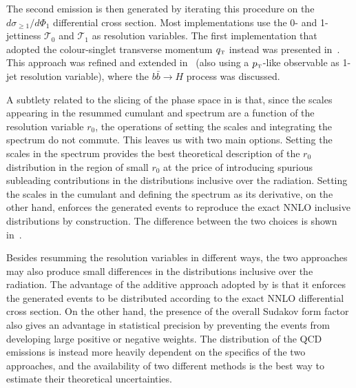\documentclass[11pt,a4paper]{article}
\begin{document}
The second emission is then generated by iterating this procedure on
the $d\sigma_{\geq 1} / d\Phi_1$ differential cross section. Most
\GENEVA{} implementations use the 0- and 1-jettiness $\mathcal{T}_0$
and $\mathcal{T}_1$ as resolution variables. The first implementation
that adopted the colour-singlet transverse momentum
$q_{\scriptscriptstyle\rm T}$ instead was presented
in~\cite{alioli:2021qbf}. This approach was refined and extended
in~\cite{Gavardi:2025zpf} (also using a $p_{\scriptscriptstyle\rm
  T}$-like observable as 1-jet resolution variable), where the $b
\bar{b} \to H$ process was discussed.

A subtlety related to the slicing of the phase space in \GENEVA{} is
that, since the scales appearing in the resummed cumulant and spectrum
are a function of the resolution variable $r_0$, the operations of
setting the scales and integrating the spectrum do not commute. This
leaves us with two main options. Setting the scales in the spectrum
provides the best theoretical description of the $r_0$ distribution in
the region of small $r_0$ at the price of introducing spurious
subleading contributions in the distributions inclusive over the
radiation. Setting the scales in the cumulant and defining the
spectrum as its derivative, on the other hand, enforces the generated
events to reproduce the exact NNLO inclusive distributions by
construction. The difference between the two choices is shown
in~.

Besides resumming the resolution variables in different ways, the two
approaches may also produce small differences in the distributions
inclusive over the radiation. The advantage of the additive approach
adopted by \GENEVA{} is that it enforces the generated events to be
distributed according to the exact NNLO differential cross section.
On the other hand, the presence of the overall Sudakov form factor also gives \minnlo{} 
an advantage in statistical precision by
preventing the events from developing large positive or negative
weights. The distribution of the QCD emissions is instead more heavily
dependent on the specifics of the two approaches, and the availability
of two different methods is the best way to estimate their theoretical
uncertainties.
\end{document}
